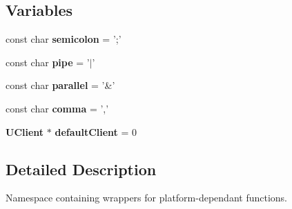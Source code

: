 \subsection*{Variables}
\begin{CompactItemize}
\item 
const char {\bf semicolon} = ';'\label{namespaceurbi_a0}

\item 
const char {\bf pipe} = '$|$'\label{namespaceurbi_a1}

\item 
const char {\bf parallel} = '\&'\label{namespaceurbi_a2}

\item 
const char {\bf comma} = ','\label{namespaceurbi_a3}

\item 
{\bf UClient} $\ast$ {\bf default\-Client} = 0\label{namespaceurbi_a4}

\end{CompactItemize}


\subsection{Detailed Description}
Namespace containing wrappers for platform-dependant functions. 